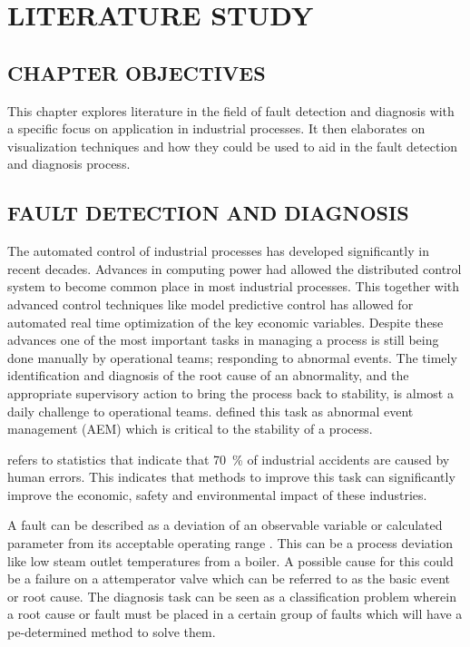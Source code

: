 
\chapter{LITERATURE STUDY}

\section{CHAPTER OBJECTIVES}

This chapter explores literature in the field of fault detection and diagnosis with a specific focus on application in industrial processes. It then elaborates on visualization techniques and how they could be used to aid in the fault detection and diagnosis process.\par

\section{FAULT DETECTION AND DIAGNOSIS}

The automated control of industrial processes has developed significantly in recent decades. Advances in computing power had allowed the distributed control system to become common place in most industrial processes. This together with advanced control techniques like model predictive control has allowed for automated real time optimization of the key economic variables. Despite these advances one of the most important tasks in managing a process is still being done manually by operational teams; responding to abnormal events. The timely identification and diagnosis of the root cause of an abnormality, and the appropriate supervisory action to bring the process back to stability, is almost a daily challenge to operational teams. \cite{venkatasubramanian2003review} defined this task as abnormal event management (AEM) which is critical to the stability of a process.\par \cite{venkatasubramanian2003review} refers to statistics that indicate that \SI{70}{\percent} of industrial accidents are caused by human errors. This indicates that methods to improve this task can significantly improve the economic, safety and environmental impact of these industries.\par
A fault can be described as a deviation of an observable variable or calculated parameter from its acceptable operating range \cite{venkatasubramanian2003review}. This can be a process deviation like low steam outlet temperatures from a boiler. A possible cause for this could be a failure on a attemperator valve which can be referred to as the basic event or root cause. The diagnosis task can be seen as a classification problem wherein a root cause or fault must be placed in a certain group of faults which will have a pe-determined method to solve them.\par

